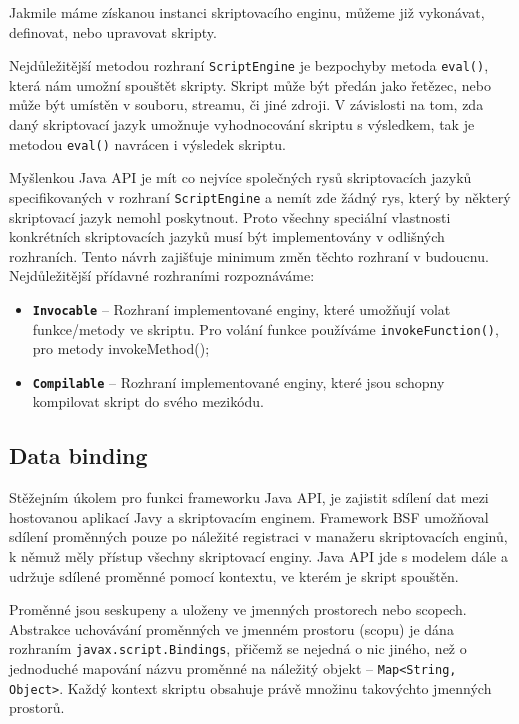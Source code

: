 Jakmile máme získanou instanci skriptovacího enginu, můžeme již vykonávat, definovat, nebo upravovat skripty.

Nejdůležitější metodou rozhraní \texttt{ScriptEngine} je bezpochyby metoda \texttt{eval()}, která nám umožní spouštět skripty. Skript může být předán jako řetězec, nebo může být umístěn v souboru, streamu, či jiné zdroji. V závislosti na tom, zda daný skriptovací jazyk umožnuje vyhodnocování skriptu s výsledkem, tak je metodou \texttt{eval()} navrácen i výsledek skriptu.

Myšlenkou Java API je mít co nejvíce společných rysů skriptovacích jazyků specifikovaných v rozhraní \texttt{ScriptEngine} a nemít zde žádný rys, který by některý skriptovací jazyk nemohl poskytnout. Proto všechny speciální vlastnosti konkrétních skriptovacích jazyků musí být implementovány v odlišných rozhraních. Tento návrh zajišťuje minimum změn těchto rozhraní v budoucnu. Nejdůležitější přídavné rozhraními rozpoznáváme:

\begin{itemize}
  \item \textbf{\texttt{Invocable}} -- Rozhraní implementované enginy, které umožňují volat funkce/metody ve skriptu. Pro volání funkce používáme \texttt{invokeFunction()}, pro metody invokeMethod();
  \item \textbf{\texttt{Compilable}} -- Rozhraní implementované enginy, které jsou schopny kompilovat skript do svého mezikódu.
\end{itemize}

\subsection{Data binding}
\label{Chapter.JavaScriptInJavaAnalysis.ScriptingJavaAPI.DataBinding}

Stěžejním úkolem pro funkci frameworku Java API, je zajistit sdílení dat mezi hostovanou aplikací Javy a skriptovacím enginem. Framework BSF umožňoval sdílení proměnných pouze po náležité registraci v manažeru skriptovacích enginů, k němuž měly přístup všechny skriptovací enginy. Java API jde s modelem dále a udržuje sdílené proměnné pomocí kontextu, ve kterém je skript spouštěn.

Proměnné jsou seskupeny a uloženy ve jmenných prostorech nebo scopech. Abstrakce uchovávání proměnných ve jmenném prostoru (scopu) je dána rozhraním \texttt{javax.script.Bindings}, přičemž se nejedná o nic jiného, než o jednoduché mapování názvu proměnné na náležitý objekt – \texttt{Map<String, Object>}. Každý kontext skriptu obsahuje právě množinu takovýchto jmenných prostorů.

